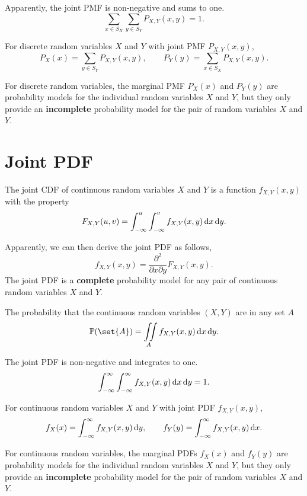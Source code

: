 Apparently, the joint PMF is non-negative and sums to one.
\[\sum_{x\in S_X}\sum_{y\in S_Y}P_{X,Y}(x,y)=1.\]

\begin{definition}
    For discrete random variables $X$ and $Y$ with joint \textnormal{PMF} $P_{X,Y}(x,y)$,
    \[P_X(x)=\sum_{y\in S_Y}P_{X,Y}(x,y), \qquad P_Y(y)=\sum_{x\in S_X}P_{X,Y}(x,y).\]
\end{definition}
For discrete random variables, the marginal PMF $P_X(x)$ and $P_Y(y)$ are probability models for the individual random variables $X$ and $Y$, but they only provide an \textbf{incomplete} probability model for the pair of random variables $X$ and $Y$.

\section{Joint PDF}
\begin{definition}
    The joint CDF of continuous random variables $X$ and $Y$ is a function $f_{X,Y}(x,y)$ with the property
    \[F_{X,Y}(u,v)=\int_{-\infty}^{u}\int_{-\infty}^{v}f_{X,Y}(x,y)\mathop{}\!\mathrm{d} x \mathop{}\!\mathrm{d} y.\]
\end{definition}

Apparently, we can then derive the joint PDF as follows,
\[f_{X,Y}(x,y)=\frac{\partial^2}{\partial x \partial y}F_{X,Y}(x,y).\]
The joint PDF is a \textbf{complete} probability model for any pair of continuous random variables $X$ and $Y$.

\begin{theorem}
    The probability that the continuous random variables $(X,Y)$ are in any set $A$
    \[\P{\set{A}}=\iint\limits_A f_{X,Y}(x,y)\diff x\diff y.\]
\end{theorem}

The joint PDF is non-negative and integrates to one.
\[\int_{-\infty}^{\infty}\int_{-\infty}^{\infty}f_{X,Y}(x,y)\mathop{}\!\mathrm{d} x\mathop{}\!\mathrm{d} y=1.\]

\begin{definition}
    \label{def:marginal_pdf}
    For continuous random variables $X$ and $Y$ with joint \textnormal{PDF} $f_{X,Y}(x,y)$,
    \[f_X(x)=\int_{-\infty}^{\infty}f_{X,Y}(x,y)\mathop{}\!\mathrm{d} y, \qquad f_Y(y)=\int_{-\infty}^{\infty}f_{X,Y}(x,y)\mathop{}\!\mathrm{d} x.\]
\end{definition}
For continuous random variables, the marginal PDFs $f_X(x)$ and $f_Y(y)$ are probability models for the individual random variables $X$ and $Y$, but they only provide an \textbf{incomplete} probability model for the pair of random variables $X$ and $Y$.

